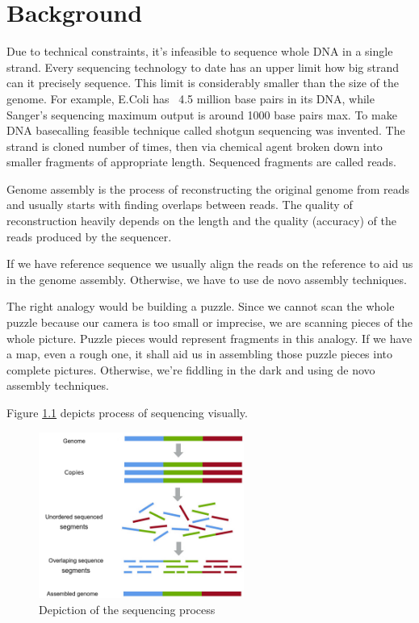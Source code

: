 \documentclass[times, utf8, diplomski, english]{fer}
\begin{document}

\chapter{Background}
\label{chap:background}
Due to technical constraints, it's infeasible to sequence whole DNA in a single strand. 
Every sequencing technology to date has an upper limit how big strand can it precisely sequence.
This limit is considerably smaller than the size of the genome.
For example, E.Coli has ~4.5 million base pairs in its DNA, while Sanger's sequencing maximum output is around 1000 base pairs max.
To make DNA basecalling feasible technique called shotgun sequencing was invented. 
The strand is cloned number of times, then via chemical agent broken down into smaller fragments of appropriate length. 
Sequenced fragments are called reads.

Genome assembly is the process of reconstructing the original genome from reads and usually starts with finding overlaps between reads.
The quality of reconstruction heavily depends on the length and the quality (accuracy) of the reads produced by the sequencer. 

If we have reference sequence we usually align the reads on the reference to aid us in the genome assembly. Otherwise, we have to use de novo assembly techniques.

The right analogy would be building a puzzle. Since we cannot scan the whole puzzle because our camera is too small or imprecise, we are scanning pieces of the whole picture. Puzzle pieces would represent fragments in this analogy. If we have a map, even a rough one, it shall aid us in assembling those puzzle pieces into complete pictures. Otherwise, we're fiddling in the dark and using de novo assembly techniques.

Figure \ref{fg:sequencing} depicts process of sequencing visually.

\begin{figure}[!ht]
    \begin{center}
        \includegraphics[width=0.6\textwidth]{shotgun-sequencing}
        \caption{Depiction of the sequencing process}
        \label{fg:sequencing}
    \end{center}
\end{figure}
\end{document}
